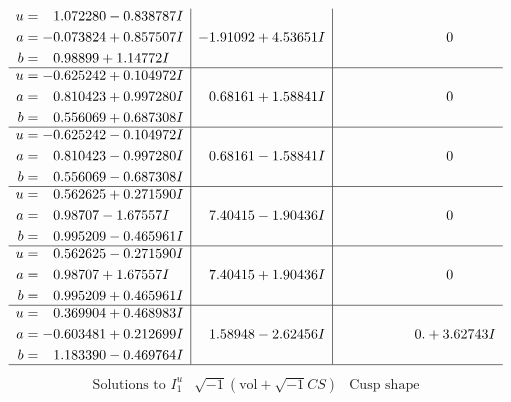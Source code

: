 \documentclass[1p]{elsarticle_modified}
\theoremstyle{definition}
\newcommand{\I}{\sqrt{-1}}
\begin{document}
$$\begin{array}{c|c|c}
\begin{aligned}
u &= \phantom{-}1.072280 - 0.838787 I \\
a &= -0.073824 + 0.857507 I \\
b &= \phantom{-}0.98899 + 1.14772 I\end{aligned}
 & -1.91092 + 4.53651 I & \phantom{-0.000000 } 0 \\ \hline\begin{aligned}
u &= -0.625242 + 0.104972 I \\
a &= \phantom{-}0.810423 + 0.997280 I \\
b &= \phantom{-}0.556069 + 0.687308 I\end{aligned}
 & \phantom{-}0.68161 + 1.58841 I & \phantom{-0.000000 } 0 \\ \hline\begin{aligned}
u &= -0.625242 - 0.104972 I \\
a &= \phantom{-}0.810423 - 0.997280 I \\
b &= \phantom{-}0.556069 - 0.687308 I\end{aligned}
 & \phantom{-}0.68161 - 1.58841 I & \phantom{-0.000000 } 0 \\ \hline\begin{aligned}
u &= \phantom{-}0.562625 + 0.271590 I \\
a &= \phantom{-}0.98707 - 1.67557 I \\
b &= \phantom{-}0.995209 - 0.465961 I\end{aligned}
 & \phantom{-}7.40415 - 1.90436 I & \phantom{-0.000000 } 0 \\ \hline\begin{aligned}
u &= \phantom{-}0.562625 - 0.271590 I \\
a &= \phantom{-}0.98707 + 1.67557 I \\
b &= \phantom{-}0.995209 + 0.465961 I\end{aligned}
 & \phantom{-}7.40415 + 1.90436 I & \phantom{-0.000000 } 0 \\ \hline\begin{aligned}
u &= \phantom{-}0.369904 + 0.468983 I \\
a &= -0.603481 + 0.212699 I \\
b &= \phantom{-}1.183390 - 0.469764 I\end{aligned}
 & \phantom{-}1.58948 - 2.62456 I & \phantom{-0.000000 -}0. + 3.62743 I\\
 \hline 
 \end{array}$$\newpage$$\begin{array}{c|c|c}  
\text{Solutions to }I^u_{1}& \I (\text{vol} + \sqrt{-1}CS) & \text{Cusp shape}\\

\end{array}$$
\end{document}
